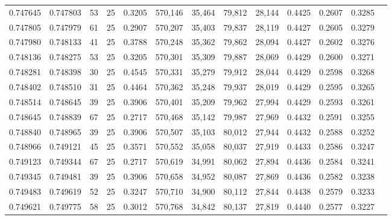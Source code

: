 \begin{tabular}{rrrrrrrrrrrrr}
0.747645 & 0.747803 &    53 &  25 &                                     0.3205 & 570,146 &  35,464 &  79,812 &  28,144 & 0.4425 & 0.2607 & 0.3285 \\
0.747805 & 0.747979 &    61 &  25 &                                     0.2907 & 570,207 &  35,403 &  79,837 &  28,119 & 0.4427 & 0.2605 & 0.3279 \\
0.747980 & 0.748133 &    41 &  25 &                                     0.3788 & 570,248 &  35,362 &  79,862 &  28,094 & 0.4427 & 0.2602 & 0.3276 \\
0.748136 & 0.748275 &    53 &  25 &                                     0.3205 & 570,301 &  35,309 &  79,887 &  28,069 & 0.4429 & 0.2600 & 0.3271 \\
0.748281 & 0.748398 &    30 &  25 &                                     0.4545 & 570,331 &  35,279 &  79,912 &  28,044 & 0.4429 & 0.2598 & 0.3268 \\
0.748402 & 0.748510 &    31 &  25 &                                     0.4464 & 570,362 &  35,248 &  79,937 &  28,019 & 0.4429 & 0.2595 & 0.3265 \\
0.748514 & 0.748645 &    39 &  25 &                                     0.3906 & 570,401 &  35,209 &  79,962 &  27,994 & 0.4429 & 0.2593 & 0.3261 \\
0.748645 & 0.748839 &    67 &  25 &                                     0.2717 & 570,468 &  35,142 &  79,987 &  27,969 & 0.4432 & 0.2591 & 0.3255 \\
0.748840 & 0.748965 &    39 &  25 &                                     0.3906 & 570,507 &  35,103 &  80,012 &  27,944 & 0.4432 & 0.2588 & 0.3252 \\
0.748966 & 0.749121 &    45 &  25 &                                     0.3571 & 570,552 &  35,058 &  80,037 &  27,919 & 0.4433 & 0.2586 & 0.3247 \\
0.749123 & 0.749344 &    67 &  25 &                                     0.2717 & 570,619 &  34,991 &  80,062 &  27,894 & 0.4436 & 0.2584 & 0.3241 \\
0.749345 & 0.749481 &    39 &  25 &                                     0.3906 & 570,658 &  34,952 &  80,087 &  27,869 & 0.4436 & 0.2582 & 0.3238 \\
0.749483 & 0.749619 &    52 &  25 &                                     0.3247 & 570,710 &  34,900 &  80,112 &  27,844 & 0.4438 & 0.2579 & 0.3233 \\
0.749621 & 0.749775 &    58 &  25 &                                     0.3012 & 570,768 &  34,842 &  80,137 &  27,819 & 0.4440 & 0.2577 & 0.3227 \\

\end{tabular}
